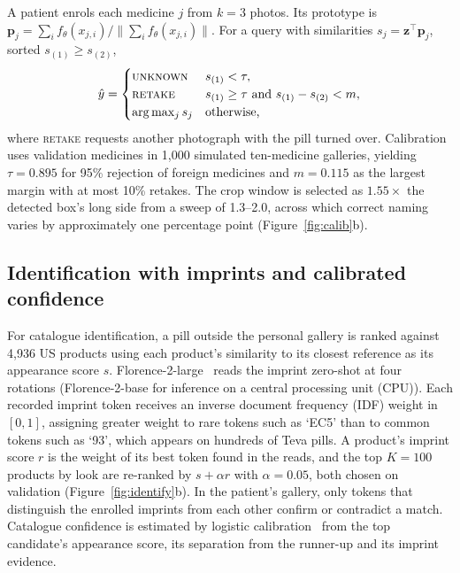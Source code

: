 A patient enrols each medicine $j$ from $k{=}3$ photos. Its prototype is
$\mathbf{p}_j=\sum_i f_\theta(x_{j,i})/\lVert\sum_i f_\theta(x_{j,i})\rVert$. For a query with similarities
$s_j=\mathbf{z}^\top\mathbf{p}_j$, sorted $s_{(1)}\ge s_{(2)}$,
\begin{equation}
  \hat y=\begin{cases}
    \textsc{unknown} & s_{(1)}<\tau,\\
    \textsc{retake} & s_{(1)}\ge\tau \text{ and } s_{(1)}-s_{(2)}<m,\\
    \arg\max_j s_j & \text{otherwise,}
  \end{cases}
  \label{eq:decision}
\end{equation}
where \textsc{retake} requests another photograph with the pill turned over. Calibration uses validation medicines in 1,000 simulated ten-medicine galleries, yielding $\tau=0.895$ for 95\% rejection of foreign medicines and $m=0.115$ as the largest margin with at most 10\% retakes. The crop window is selected as $1.55\times$ the detected box's long side from a sweep of 1.3--2.0, across which correct naming varies by approximately one percentage point (Figure~\ref{fig:calib}b).



\subsection{Identification with imprints and calibrated confidence}
\label{sec:identify}

For catalogue identification, a pill outside the personal gallery is ranked against 4,936 US products using each product's similarity to its closest reference as its appearance score $s$. Florence-2-large~\citep{xiao2024florence2} reads the imprint zero-shot at
four rotations (Florence-2-base for inference on a central processing unit (CPU)). Each recorded imprint token receives an inverse document frequency (IDF) weight in $[0,1]$, assigning greater weight to rare tokens such as `EC5' than to common tokens such as `93', which appears on hundreds of Teva pills. A product's imprint
score $r$ is the weight of its best token found in the reads, and the top $K{=}100$ products by look are re-ranked by
$s+\alpha r$ with $\alpha=0.05$, both chosen on validation (Figure~\ref{fig:identify}b). In the patient's gallery, only
tokens that distinguish the enrolled imprints from each other confirm or contradict a match. Catalogue confidence is estimated by logistic calibration~\citep{platt1999probabilistic} from the top candidate's appearance score, its separation from the runner-up and its imprint evidence. 

